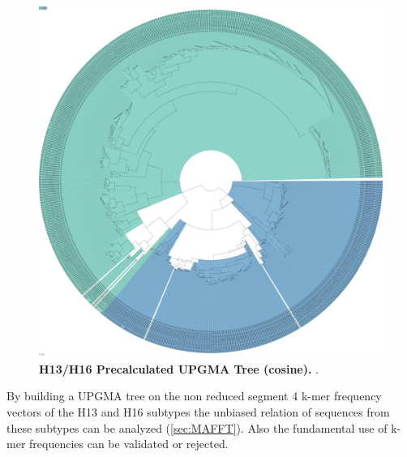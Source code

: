 \begin{figure}[!hbt]
    \centering
    \includegraphics[width=\textwidth]{PCA/Precalculated_Segment_4_H_Cosine.pdf}
    \caption[H13/H16 Precalculated \Acrshort{UPGMA} Tree (cosine)]{\textbf{H13/H16 Precalculated \Acrshort{UPGMA} Tree (cosine).} .}
    \label{fig:Precalculated_Cosine}
\end{figure}

By building a \gls{UPGMA} tree on the non reduced segment 4 k-mer frequency vectors of the H13 and H16 subtypes the unbiased relation of sequences from these subtypes can be analyzed (\autoref{sec:MAFFT}). Also the fundamental use of k-mer frequencies can be validated or rejected. 


